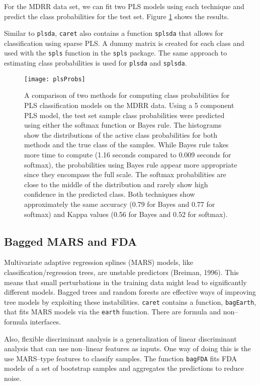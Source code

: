\documentclass[12pt]{article}
\begin{document}
For the MDRR data set, we can fit two PLS models using each technique and predict the class probabilities for the test set. Figure \ref{f:plsProbs}  shows the results.

Similar to \texttt{plsda}, \texttt{caret} also contains a function \texttt{splsda} that allows for classification using sparse PLS. A dummy 
matrix is created for each class and used with the \texttt{spls} function in the \texttt{spls} package. The same approach to estimating class probabilities is used for \texttt{plsda} and \texttt{splsda}.


\begin{figure}
   \begin{center}		
      \texttt{[image: plsProbs]}
\caption{A comparison of two methods for computing class probabilities for PLS classification models on the MDRR data. Using a 5 component PLS model, the test set sample class probabilities were predicted using either the softmax function or Bayes rule. The histograms show the distributions of the active class probabilities for both methods and the true class of the samples. While Bayes rule takes more time to compute (1.16 seconds compared to 0.009 seconds for softmax), the probabilities using Bayes rule appear more appropriate since they encompass the full scale. The softmax probabilities are close to the middle of the distribution and rarely show high confidence in the predicted class. Both techniques show approximately the same accuracy (0.79 for Bayes and 0.77 for softmax) and Kappa values (0.56 for Bayes and 0.52 for softmax).}
      \label{f:plsProbs}       
   \end{center}
\end{figure}  

\subsection{Bagged MARS and FDA}

Multivariate adaptive regression splines (MARS) models, like classification/regression trees, are unstable predictors (Breiman, 1996). This means that small perturbations in the training data might lead to significantly different models. Bagged trees and random forests are effective ways of improving tree models by exploiting these instabilities. \texttt{caret} contains a function, \texttt{bagEarth}, that fits MARS models via the \texttt{earth} function. There are formula and non--formula interfaces. 

Also, flexible discriminant analysis is a generalization of linear discriminant analysis that can use non--linear features as inputs. One way of doing this is the use MARS--type features to classify samples. The function \texttt{bagFDA} fits FDA models of a set of bootstrap samples and aggregates the predictions to reduce noise.  
\end{document}
